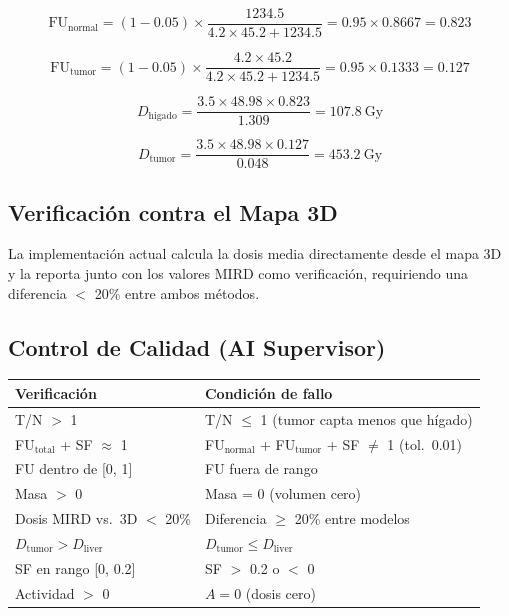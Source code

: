 \documentclass[12pt,a4paper]{article}
\begin{document}
$$\text{FU}_{\text{normal}} = (1 - 0.05) \times \frac{1234.5}{4.2 \times 45.2 + 1234.5} = 0.95 \times 0.8667 = 0.823$$

$$\text{FU}_{\text{tumor}} = (1 - 0.05) \times \frac{4.2 \times 45.2}{4.2 \times 45.2 + 1234.5} = 0.95 \times 0.1333 = 0.127$$

$$D_{\text{higado}} = \frac{3.5 \times 48.98 \times 0.823}{1.309} = 107.8\ \text{Gy}$$

$$D_{\text{tumor}} = \frac{3.5 \times 48.98 \times 0.127}{0.048} = 453.2\ \text{Gy}$$

\subsection{Verificación contra el Mapa 3D}

La implementación actual calcula la dosis media directamente desde el mapa 3D y la reporta junto con los valores MIRD como verificación, requiriendo una diferencia $<$ 20\% entre ambos métodos.

\subsection*{Control de Calidad (AI Supervisor)}

\begin{tabular}{p{5cm} p{10cm}}
\toprule
\textbf{Verificación} & \textbf{Condición de fallo} \\
\midrule
T/N $>$ 1 & T/N $\leq$ 1 (tumor capta menos que hígado) \\
FU$_{\text{total}}$ + SF $\approx$ 1 & FU$_{\text{normal}}$ + FU$_{\text{tumor}}$ + SF $\neq$ 1 (tol.\ 0.01) \\
FU dentro de [0, 1] & FU fuera de rango \\
Masa $>$ 0 & Masa = 0 (volumen cero) \\
Dosis MIRD vs.\ 3D $<$ 20\% & Diferencia $\geq$ 20\% entre modelos \\
$D_{\text{tumor}} > D_{\text{liver}}$ & $D_{\text{tumor}} \leq D_{\text{liver}}$ \\
SF en rango [0, 0.2] & SF $>$ 0.2 o $<$ 0 \\
Actividad $>$ 0 & $A = 0$ (dosis cero) \\
\bottomrule
\end{tabular}

\newpage

\end{document}
